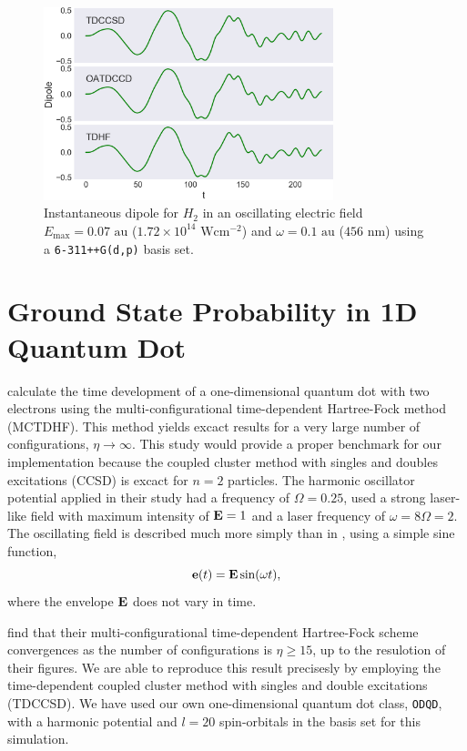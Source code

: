 \begin{figure}
    \centering
    \includegraphics[width=0.75\textwidth]{results/figures/li_compare.png}
    \caption{Instantaneous dipole for $H_2$ in an oscillating electric field
        $E_\text{max} = 0.07 \text{ au}$ ($1.72\times10^14 \text{ W} \text{cm}^{-2}$)
        and $\omega=0.1 \text{ au}$ ($456\text{ nm}$) using a \lstinline{6-311++G(d,p)}
        basis set.
    }
    \label{fig:li_compare}
\end{figure}


\section{Ground State Probability in 1D Quantum Dot}

\citeauthor{Zanghellini04}\cite{Zanghellini04} calculate the time development of a 
one-dimensional quantum dot with two electrons using the multi-configurational 
time-dependent Hartree-Fock method (MCTDHF). This method yields excact results for 
a very large number of configurations, $\eta \to \infty$. This study would provide a 
proper benchmark for our implementation because the coupled cluster method with singles and 
doubles excitations (CCSD) is excact for $n=2$ particles. 
The harmonic oscillator potential applied in
their study had a frequency of $\Omega=0.25$, used a strong laser-like field with 
maximum intensity of $\vb{E} = 1$ and a laser frequency of $\omega = 8 \Omega = 2$.
The oscillating field is described much more simply than in
\citeauthor{li2005time}\cite{li2005time}, using a simple sine function,
\begin{equation}
    \vb{e}(t) = \vb{E}\sin(\omega t),
\end{equation}
where the envelope $\vb{E}$ does not vary in time.

\citeauthor{Zanghellini04}\cite{Zanghellini04} find that their multi-configurational time-dependent
Hartree-Fock scheme convergences as the number of configurations is 
$\eta \geq15$, up to the resulotion of their figures.
We are able to reproduce this result precisesly by employing the 
time-dependent coupled cluster method with singles and double excitations (TDCCSD).
We have used our own one-dimensional quantum dot class, \lstinline{ODQD}, with 
a harmonic potential and $l=20$ spin-orbitals
in the basis set for this simulation.

